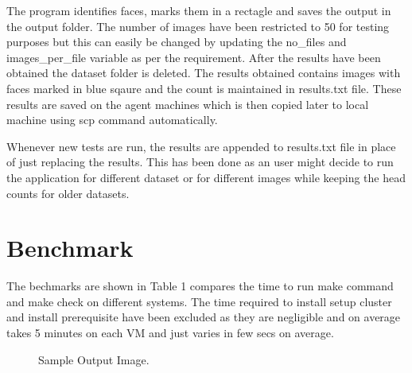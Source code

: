 \documentclass[9pt,twocolumn,twoside]{../../styles/osajnl}
\begin{document}
The program identifies faces, marks them in a rectagle and saves the
output in the output folder. The number of images have been restricted
to 50 for testing purposes but this can easily be changed by updating
the no\_files and images\_per\_file variable as per the
requirement. After the results have been obtained the dataset folder
is deleted. The results obtained contains images with faces marked in
blue sqaure and the count is maintained in results.txt file. These
results are saved on the agent machines which is then copied later to
local machine using scp command automatically.

Whenever new tests are run, the results are appended to results.txt
file in place of just replacing the results. This has been done as an
user might decide to run the application for different dataset or for
different images while keeping the head counts for older datasets.

\section{Benchmark}
The bechmarks are shown in Table 1 compares the
time to run make command and make check on different systems. The time
required to install setup cluster and install prerequisite have been
excluded as they are negligible and on average takes 5 minutes on each
VM and just varies in few secs on average.

\begin{figure}[htbp]
\centering
{}
\caption{Sample Output Image.}
\label{fig:false-color}
\end{figure}
\end{document}
